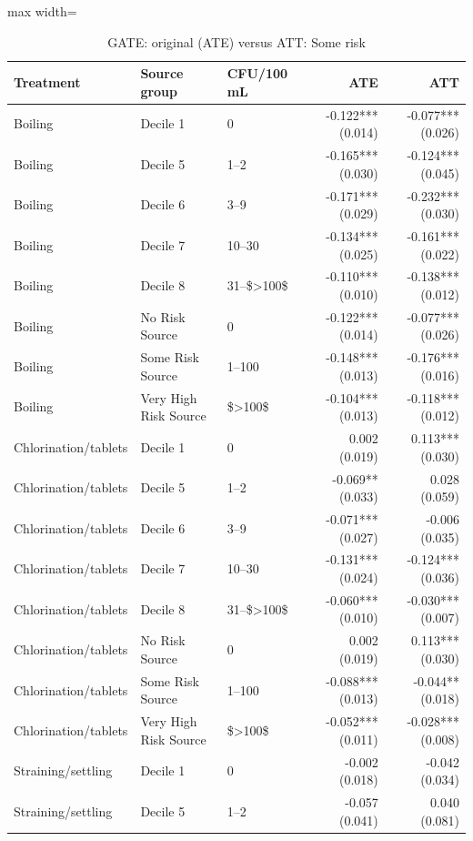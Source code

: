 \begin{table}[htbp]
\centering\scriptsize
\caption{GATE: original (ATE) versus ATT: Some risk}
\label{tab:table-ate-att-heterogeneity-gates-SomeRiskHome}
\begin{adjustbox}{max width=\linewidth}
\begin{tabular}{lllrr}
\toprule
Treatment & Source group & CFU/100 mL & ATE & ATT \\
\midrule
Boiling & Decile 1 & 0 & -0.122*** (0.014) & -0.077*** (0.026) \\
Boiling & Decile 5 & 1--2 & -0.165*** (0.030) & -0.124*** (0.045) \\
Boiling & Decile 6 & 3--9 & -0.171*** (0.029) & -0.232*** (0.030) \\
Boiling & Decile 7 & 10--30 & -0.134*** (0.025) & -0.161*** (0.022) \\
Boiling & Decile 8 & 31--\$\textgreater{}100\$ & -0.110*** (0.010) & -0.138*** (0.012) \\
Boiling & No Risk Source & 0 & -0.122*** (0.014) & -0.077*** (0.026) \\
Boiling & Some Risk Source & 1--100 & -0.148*** (0.013) & -0.176*** (0.016) \\
Boiling & Very High Risk Source & \$\textgreater{}100\$ & -0.104*** (0.013) & -0.118*** (0.012) \\
Chlorination/tablets & Decile 1 & 0 & 0.002 (0.019) & 0.113*** (0.030) \\
Chlorination/tablets & Decile 5 & 1--2 & -0.069** (0.033) & 0.028 (0.059) \\
Chlorination/tablets & Decile 6 & 3--9 & -0.071*** (0.027) & -0.006 (0.035) \\
Chlorination/tablets & Decile 7 & 10--30 & -0.131*** (0.024) & -0.124*** (0.036) \\
Chlorination/tablets & Decile 8 & 31--\$\textgreater{}100\$ & -0.060*** (0.010) & -0.030*** (0.007) \\
Chlorination/tablets & No Risk Source & 0 & 0.002 (0.019) & 0.113*** (0.030) \\
Chlorination/tablets & Some Risk Source & 1--100 & -0.088*** (0.013) & -0.044** (0.018) \\
Chlorination/tablets & Very High Risk Source & \$\textgreater{}100\$ & -0.052*** (0.011) & -0.028*** (0.008) \\
Straining/settling & Decile 1 & 0 & -0.002 (0.018) & -0.042 (0.034) \\
Straining/settling & Decile 5 & 1--2 & -0.057 (0.041) & 0.040 (0.081) \\

\end{tabular}
\end{adjustbox}
\end{table}
